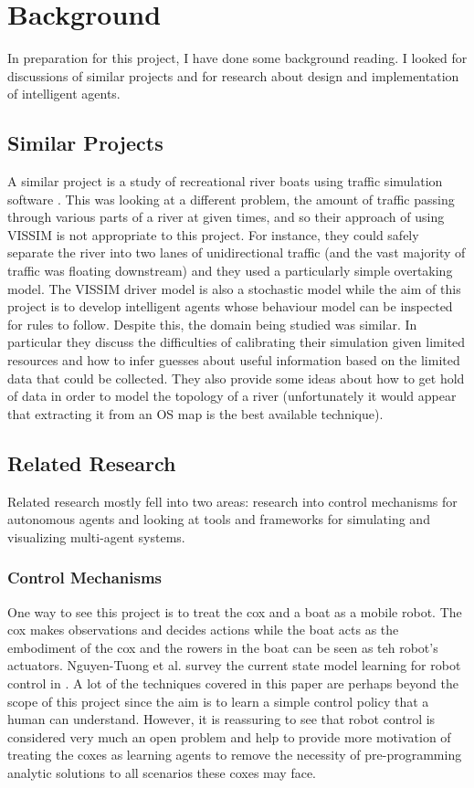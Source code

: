 \chapter{Background}

In preparation for this project, I have done some background
reading. I looked for discussions of similar projects and for research about design and implementation of intelligent agents. 

\section{Similar Projects}

A similar project is a study of recreational river boats using
traffic simulation software \cite{Lowry2011}. This was looking at a
different problem, the amount of traffic passing through various parts
of a river at given times, and so their approach of using VISSIM is
not appropriate to this project. For instance, they could safely
separate the river into two lanes of unidirectional traffic (and the
vast majority of traffic was floating downstream) and they used a
particularly simple overtaking model. The VISSIM driver model is also
a stochastic model while the aim of this project is to develop
intelligent agents whose behaviour model can be inspected for rules to
follow. Despite this, the domain being studied was
similar. In particular they discuss the difficulties of calibrating
their simulation given limited resources and how to infer guesses
about useful information based on the limited data that could be
collected. They also provide some ideas about how to get hold of data
in order to model the topology of a river (unfortunately it would
appear that extracting it from an OS map is the best available
technique).

\section{Related Research}

Related research mostly fell into two areas: research into control mechanisms for
autonomous agents and looking at tools and frameworks for simulating
and visualizing multi-agent systems.

\subsection{Control Mechanisms}

One way to see this project is to treat the cox and a boat as a mobile
robot. The cox makes observations and decides actions while the boat
acts as the embodiment of the cox and the rowers in the boat can be
seen as teh robot's actuators. Nguyen-Tuong et al. survey the current state
model learning for robot control in \cite{Nguyen-Tuong2011}. A lot of
the techniques covered in this paper are perhaps beyond the scope of
this project since the aim is to learn a simple control policy that a
human can understand. However, it is reassuring to see that robot
control is considered very much an open problem and help to provide
more motivation of treating the coxes as learning agents to remove the
necessity of pre-programming analytic solutions to all scenarios these
coxes may face.

